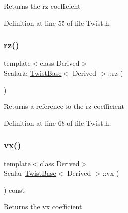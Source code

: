 \begin{DoxyReturn}{Returns}
the {\ttfamily rz} coefficient 
\end{DoxyReturn}


Definition at line 55 of file Twist.\+h.

\hypertarget{class_twist_base_a0ca49c0005a9a87ddebd2e3892687529}{}\label{class_twist_base_a0ca49c0005a9a87ddebd2e3892687529} 
\subsubsection{\texorpdfstring{rz()}{rz()}\hspace{0.1cm}{\footnotesize\ttfamily [2/2]}}
{\footnotesize\ttfamily template$<$class Derived$>$ \\
Scalar\& \hyperlink{class_twist_base}{Twist\+Base}$<$ Derived $>$\+::rz (\begin{DoxyParamCaption}{ }\end{DoxyParamCaption})\hspace{0.3cm}{\ttfamily [inline]}}

\begin{DoxyReturn}{Returns}
a reference to the {\ttfamily rz} coefficient 
\end{DoxyReturn}


Definition at line 68 of file Twist.\+h.

\hypertarget{class_twist_base_a323021f263783da2d5b275552858ab67}{}\label{class_twist_base_a323021f263783da2d5b275552858ab67} 
\subsubsection{\texorpdfstring{vx()}{vx()}\hspace{0.1cm}{\footnotesize\ttfamily [1/2]}}
{\footnotesize\ttfamily template$<$class Derived$>$ \\
Scalar \hyperlink{class_twist_base}{Twist\+Base}$<$ Derived $>$\+::vx (\begin{DoxyParamCaption}{ }\end{DoxyParamCaption}) const\hspace{0.3cm}{\ttfamily [inline]}}

\begin{DoxyReturn}{Returns}
the {\ttfamily vx} coefficient 
\end{DoxyReturn}


